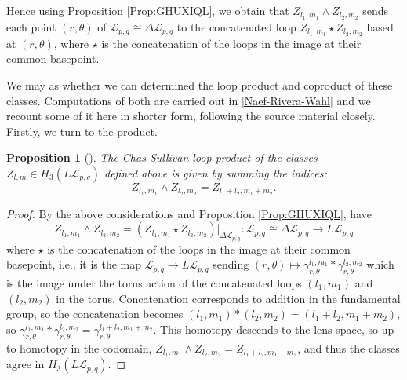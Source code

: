 \documentclass[reqno]{amsart}
\newtheorem{proposition}[theorem]{Proposition}
\theoremstyle{definition}
\theoremstyle{remark}
\begin{document}
Hence using Proposition \ref{Prop:GHUXIQL}, we obtain
that $Z_{l_1, m_1} \wedge
Z_{l_2, m_2}$ sends each point $\left( r, \theta \right) $
of $\mathcal{L}_{p,q} \cong \Delta
\mathcal{L}_{p,q}$ to the concatenated loop
$Z_{l_1,m_1} \star Z_{l_2,m_2}$ based at
$(r, \theta)$,
where $\star$ is the concatenation of the loops in the image
at their common basepoint.\\
\linebreak


We may as whether we can determined the loop product and
coproduct of these classes. Computations of both are carried
out in \ref{Naef-Rivera-Wahl} and we recount some of it here in
shorter form, following the source material closely.\\

Firstly, we turn to the product.

\begin{proposition}[]
    The Chas-Sullivan loop product of the classes
    $Z_{l,m} \in H_3 \left( L \mathcal{L}_{p,q} \right) $ defined
    above is given by summing the indices:
    \[
    Z_{l_1,m_1} \wedge Z_{l_2,m_2} = 
    Z_{l_1+l_2 , m_1+m_2}.
    \] 
\end{proposition}

\begin{proof}
    By the above considerations and
    Proposition \ref{Prop:GHUXIQL}, have
    \[
    Z_{l_1,m_1} \wedge
    Z_{l_2,m_2}  
    = \left( Z_{l_1,m_1}\star Z_{l_2,m_2} \right) |_{\Delta \mathcal{L}_{p,q}}
    \colon \mathcal{L}_{p,q} \cong
    \Delta \mathcal{L}_{p,q} \to L \mathcal{L}_{p,q}
    \] 
    where $\star$ is the concatenation of the loops in the image
    at their common basepoint, i.e.,
    it is the map
    $\mathcal{L}_{p,q} \to L \mathcal{L}_{p,q}$ sending
    $\left( r, \theta \right) \mapsto 
    \gamma_{r, \theta}^{l_1, m_1} * \gamma_{r, \theta}^{l_2, m_2}$ which
    is the image under the torus action of the
    concatenated loops
    $\left( l_1,m_1 \right) $ and $\left( l_2,m_2 \right) $ in the
    torus. Concatenation corresponds to addition
    in the fundamental group, so the
    concatenation becomes
    $\left( l_1,m_1 \right) * \left( l_2,m_2 \right) =
    \left( l_1+l_2, m_1+m_2 \right) $, so 
    $\gamma_{r,\theta}^{l_1,m_1} * \gamma_{r,\theta}^{l_2, m_2} =
    \gamma_{r, \theta}^{l_1+l_2, m_1+m_2}$.
    This homotopy descends to the lens space, so
    up to homotopy in the codomain,
    $Z_{l_1,m_1} \wedge Z_{l_2,m_2} = 
    Z_{l_1+l_2, m_1+m_2}$, and thus the classes
    agree in $H_{3} \left( L \mathcal{L}_{p,q} \right) $.
\end{proof}
\end{document}
